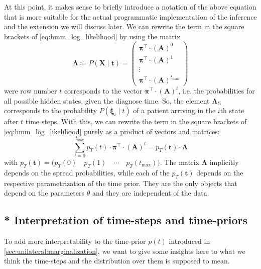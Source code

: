 \documentclass[\relativeRoot/main.tex]{subfiles}
\begin{document}
At this point, it makes sense to briefly introduce a notation of the above equation that is more suitable for the actual programmatic implementation of the inference and the extension we will discuss later. We can rewrite the term in the square brackets of \cref{eq:hmm_log_likelihood} by using the matrix
%
\begin{equation} \label{eq:hmm_matrix_lambda}
    \boldsymbol{\Lambda} \coloneqq 
    P \left( \mathbf{X} \mid \mathbf{t} \right) = 
    \begin{pmatrix}
        \boldsymbol{\pi}^\top \cdot \left( \mathbf{A} \right)^0 \\
        \boldsymbol{\pi}^\top \cdot \left( \mathbf{A} \right)^1 \\
        \vdots \\
        \boldsymbol{\pi}^\top \cdot \left( \mathbf{A} \right)^{t_\text{max}}
    \end{pmatrix}
\end{equation}
%
were row number $t$ corresponds to the vector $\boldsymbol{\pi}^\top \cdot \left( \mathbf{A} \right)^t$, i.e. the probabilities for all possible hidden states, given the diagnose time. So, the element $\boldsymbol{\Lambda}_{ti}$ corresponds to the probability $P \left( \boldsymbol{\xi}_i \mid t \right)$ of a patient arriving in the $i$th state after $t$ time steps. With this, we can rewrite the term in the square brackets of \cref{eq:hmm_log_likelihood} purely as a product of vectors and matrices:
%
\begin{equation}
    \sum_{t = 0}^{t_\text{max}}{p_T (t) \cdot \boldsymbol{\pi}^\top \cdot (\mathbf{A})^t} = p_T \left( \mathbf{t} \right) \cdot \boldsymbol{\Lambda}
\end{equation}
%
with $p_T \left( \mathbf{t} \right) = \big( p_T(0) \quad p_T(1) \quad \cdots \quad p_T(t_\text{max}) \big)$. The matrix $\boldsymbol{\Lambda}$ implicitly depends on the spread probabilities, while each of the $p_T(\mathbf{t})$ depends on the respective parametrization of the time prior. They are the only objects that depend on the parameters $\theta$ and they are independent of the data.


\subsection{* Interpretation of time-steps and time-priors}
\label{subsec:unilateral:tstage:interpretation}

To add more interpretability to the time-prior $p(t)$ introduced in \cref{sec:unilateral:marginalization}, we want to give some insights here to what we think the time-steps and the distribution over them is supposed to mean.
\end{document}
